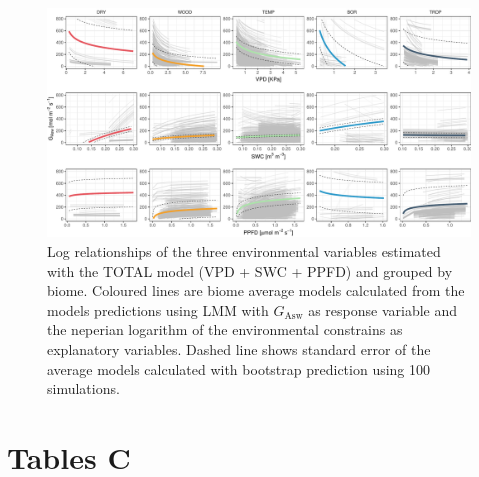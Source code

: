 \documentclass[11pt,twoside]{reedthesis}
\begin{document}
\newpage

\setlength{\abovecaptionskip}{15pt}
\begin{figure}[hbt!]

{\centering \includegraphics[width=1\linewidth]{figure/appendixC/spa_plots} 

}

\caption[Log relationships of the three environmental variables estimated with the TOTAL model (VPD + SWC + PPFD) and grouped by biome.]{Log relationships of the three environmental variables estimated with the TOTAL model (VPD + SWC + PPFD) and grouped by biome. Coloured lines are biome average models calculated from the models predictions using LMM with $G_{\text{Asw}}$ as response variable and the neperian logarithm of the environmental constrains as explanatory variables. Dashed line shows standard error of the average models calculated with bootstrap prediction using 100 simulations.}\label{fig:unnamed-chunk-11}
\end{figure}
\setlength{\abovecaptionskip}{0pt} \newpage

\section{Tables C}\label{tables-c}
\end{document}
